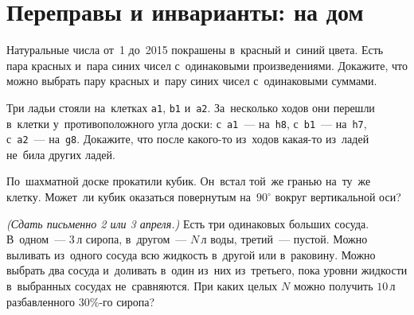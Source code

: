 
\section*{Переправы и инварианты: на дом}




\begin{problems}

Натуральные числа от~1 до~2015 покрашены в~красный и~синий цвета.
Есть пара красных и~пара синих чисел с~одинаковыми произведениями.
Докажите, что можно выбрать пару красных и~пару синих чисел с~одинаковыми
суммами.

Три ладьи стояли на~клетках \texttt{a1}, \texttt{b1} и~\texttt{a2}.
За~несколько ходов они перешли в~клетки у~противоположного угла доски:
с~\texttt{a1}~--- на~\texttt{h8},
с~\texttt{b1}~--- на~\texttt{h7},
с~\texttt{a2}~--- на~\texttt{g8}.
Докажите, что после какого-то из~ходов какая-то из~ладей не~била других ладей.

По~шахматной доске прокатили кубик.
Он~встал той~же гранью на~ту~же клетку.
Может~ли кубик оказаться повернутым на~$90^\circ$ вокруг вертикальной оси?

\emph{(Сдать письменно 2 или 3 апреля.)}
Есть три одинаковых больших сосуда.
В~одном~--- $3\,\text{л}$ сиропа, в~другом~--- $N\,\text{л}$ воды,
третий~--- пустой.
Можно выливать из~одного сосуда всю жидкость в~другой или в~раковину.
Можно выбрать два сосуда и~доливать в~один из~них из~третьего, пока уровни
жидкости в~выбранных сосудах не~сравняются.
При каких целых $N$ можно получить $10\,\text{л}$ разбавленного $30\%$-го
сиропа?

\end{problems}

